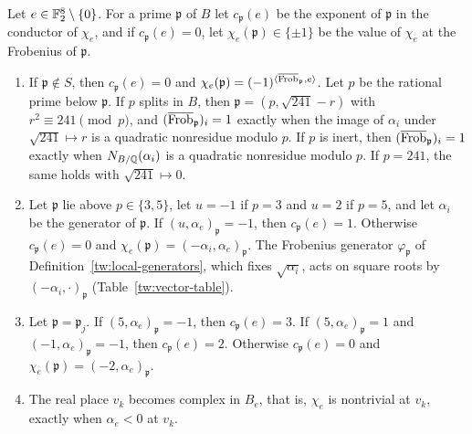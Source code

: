 \begin{proposition}\label{gf:local-data}
Let $e\in\mathbb F_2^8\setminus\{0\}$. For a prime $\mathfrak p$ of $B$ let
$c_{\mathfrak p}(e)$ be the exponent of $\mathfrak p$ in the conductor of
$\chi_e$, and if $c_{\mathfrak p}(e)=0$, let $\chi_e(\mathfrak p)\in\{\pm1\}$
be the value of $\chi_e$ at the Frobenius of $\mathfrak p$.
\begin{enumerate}
\item If $\mathfrak p\notin S$, then $c_{\mathfrak p}(e)=0$ and
 $\chi_e(\mathfrak p)=(-1)^{\langle\overline{\operatorname{Frob}}_{\mathfrak p},e\rangle}$.
 Let $p$ be the rational prime below $\mathfrak p$. If $p$ splits in $B$, then
 $\mathfrak p=(p,\sqrt{241}-r)$ with $r^2\equiv241\pmod p$, and
 $(\overline{\operatorname{Frob}}_{\mathfrak p})_i=1$ exactly when the image of $\alpha_i$
 under $\sqrt{241}\mapsto r$ is a quadratic nonresidue modulo $p$. If $p$ is
 inert, then $(\overline{\operatorname{Frob}}_{\mathfrak p})_i=1$ exactly when
 $N_{B/\mathbb Q}(\alpha_i)$ is a quadratic nonresidue modulo $p$. If $p=241$, the
 same holds with $\sqrt{241}\mapsto0$.
\item Let $\mathfrak p$ lie above $p\in\{3,5\}$, let $u=-1$ if $p=3$ and $u=2$
 if $p=5$, and let $\alpha_i$ be the generator of $\mathfrak p$. If
 $(u,\alpha_e)_{\mathfrak p}=-1$, then $c_{\mathfrak p}(e)=1$. Otherwise
 $c_{\mathfrak p}(e)=0$ and
 $\chi_e(\mathfrak p)=(-\alpha_i,\alpha_e)_{\mathfrak p}$. The Frobenius
 generator $\varphi_{\mathfrak p}$ of Definition~\ref{tw:local-generators},
 which fixes $\sqrt{\alpha_i}$, acts on square roots by
 $(-\alpha_i,\cdot)_{\mathfrak p}$ (Table~\ref{tw:vector-table}).
\item Let $\mathfrak p=\mathfrak p_j$. If $(5,\alpha_e)_{\mathfrak p}=-1$, then
 $c_{\mathfrak p}(e)=3$. If $(5,\alpha_e)_{\mathfrak p}=1$ and
 $(-1,\alpha_e)_{\mathfrak p}=-1$, then $c_{\mathfrak p}(e)=2$. Otherwise
 $c_{\mathfrak p}(e)=0$ and $\chi_e(\mathfrak p)=(-2,\alpha_e)_{\mathfrak p}$.
\item The real place $v_k$ becomes complex in $B_e$, that is, $\chi_e$ is
 nontrivial at $v_k$, exactly when $\alpha_e<0$ at $v_k$.
\end{enumerate}
\end{proposition}

